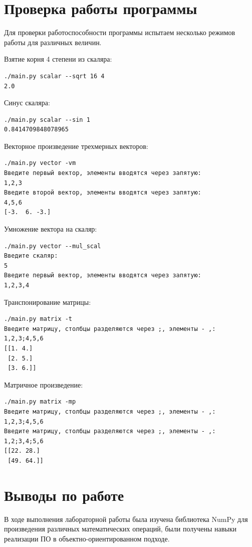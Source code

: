 \documentclass[a4paper,14pt]{extarticle}
\begin{document}
\newpage

\section{Проверка работы программы}
Для проверки работоспособности программы испытаем 
несколько режимов работы для различных величин.

\vspace{0.1cm}

Взятие корня 4 степени из скаляра:
\begin{verbatim}
./main.py scalar --sqrt 16 4
2.0
\end{verbatim}
 
Синус скаляра: 
\begin{verbatim}
./main.py scalar --sin 1
0.8414709848078965
\end{verbatim}

Векторное произведение трехмерных векторов:
\begin{verbatim}
./main.py vector -vm 
Введите первый вектор, элементы вводятся через запятую:
1,2,3
Введите второй вектор, элементы вводятся через запятую:
4,5,6
[-3.  6. -3.]
\end{verbatim}

Умножение вектора на скаляр:
\begin{verbatim}
./main.py vector --mul_scal
Введите скаляр:
5 
Введите первый вектор, элементы вводятся через запятую:
1,2,3,4
\end{verbatim}

Транспонирование матрицы:
\begin{verbatim}
./main.py matrix -t 
Введите матрицу, столбцы разделяются через ;, элементы - ,:
1,2,3;4,5,6
[[1. 4.]
 [2. 5.]
 [3. 6.]]
\end{verbatim}

Матричное произведение:
\begin{verbatim}
./main.py matrix -mp 
Введите матрицу, столбцы разделяются через ;, элементы - ,:
1,2,3;4,5,6
Введите матрицу, столбцы разделяются через ;, элементы - ,:
1,2;3,4;5,6
[[22. 28.]
 [49. 64.]]
\end{verbatim}

\section*{Выводы по работе}
В ходе выполнения лабораторной работы была изучена библиотека NumPy для произведения различных математических операций, были получены навыки реализации ПО в объектно-ориентированном подходе.
\end{document}
